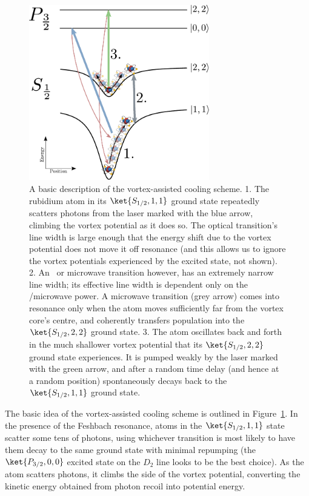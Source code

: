 \begin{figure}
\begin{center}
\includegraphics[width=0.7\textwidth]{figures/unsorted/vortexcooling.pdf}
\caption{A basic description of the vortex-assisted cooling scheme. 1. The rubidium atom in its $\ket{S_{1/2}, 1,1}$ ground state repeatedly scatters photons from the laser marked with the blue arrow, climbing the vortex potential as it does so. The optical transition's line width is large enough that the energy shift due to the vortex potential does not move it off resonance (and this allows us to ignore the vortex potentials experienced by the excited state, not shown). 2. An \rf\ or microwave transition however, has an extremely narrow line width; its effective line width is dependent only on the \rf/microwave power. A microwave transition (grey arrow) comes into resonance only when the atom moves sufficiently far from the vortex core's centre, and coherently transfers population into the $\ket{S_{1/2}, 2,2}$ ground state. 3. The atom oscillates back and forth in the much shallower vortex potential that its $\ket{S_{1/2}, 2,2}$ ground state experiences. It is pumped weakly by the laser marked with the green arrow, and after a random time delay (and hence at a random position) spontaneously decays back to the $\ket{S_{1/2}, 1,1}$ ground state.
}\label{fig:vortexcooling}
\end{center}
\end{figure}

The basic idea of the vortex-assisted cooling scheme is outlined in Figure~\ref{fig:vortexcooling}. In the presence of the Feshbach resonance, atoms in the $\ket{S_{1/2}, 1,1}$ state scatter some tens of photons, using whichever transition is most likely to have them decay to the same ground state with minimal repumping (the $\ket{P_{3/2}, 0,0}$ excited state on the $D_2$ line looks to be the best choice). As the atom scatters photons, it climbs the side of the vortex potential, converting the kinetic energy obtained from photon recoil into potential energy.

